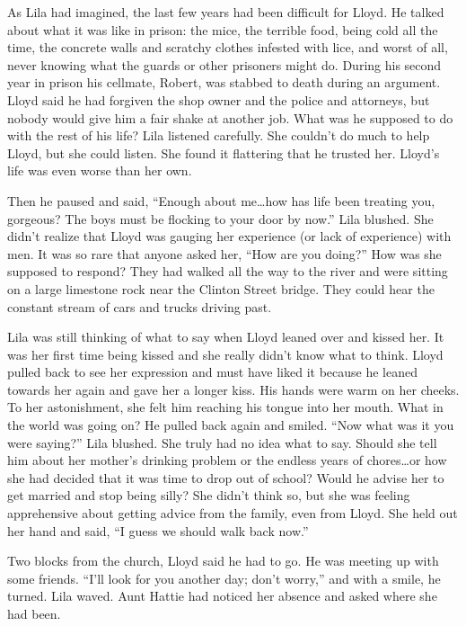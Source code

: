 \documentclass[
  american,
  letterpaper,
]{book}
\begin{document}
As Lila had imagined, the last few years had been difficult for Lloyd.
He talked about what it was like in prison: the mice, the terrible food,
being cold all the time, the concrete walls and scratchy clothes
infested with lice, and worst of all, never knowing what the guards or
other prisoners might do. During his second year in prison his cellmate,
Robert, was stabbed to death during an argument. Lloyd said he had
forgiven the shop owner and the police and attorneys, but nobody would
give him a fair shake at another job. What was he supposed to do with
the rest of his life? Lila listened carefully. She couldn't do much to
help Lloyd, but she could listen. She found it flattering that he
trusted her. Lloyd's life was even worse than her own.

Then he paused and said, ``Enough about me\ldots how has life been
treating you, gorgeous? The boys must be flocking to your door by now.''
Lila blushed. She didn't realize that Lloyd was gauging her experience
(or lack of experience) with men. It was so rare that anyone asked her,
``How are you doing?'' How was she supposed to respond? They had walked
all the way to the river and were sitting on a large limestone rock near
the Clinton Street bridge. They could hear the constant stream of cars
and trucks driving past.

Lila was still thinking of what to say when Lloyd leaned over and kissed
her. It was her first time being kissed and she really didn't know what
to think. Lloyd pulled back to see her expression and must have liked it
because he leaned towards her again and gave her a longer kiss. His
hands were warm on her cheeks. To her astonishment, she felt him
reaching his tongue into her mouth. What in the world was going on? He
pulled back again and smiled. ``Now what was it you were saying?'' Lila
blushed. She truly had no idea what to say. Should she tell him about
her mother's drinking problem or the endless years of chores\ldots or
how she had decided that it was time to drop out of school? Would he
advise her to get married and stop being silly? She didn't think so, but
she was feeling apprehensive about getting advice from the family, even
from Lloyd. She held out her hand and said, ``I guess we should walk
back now.''

Two blocks from the church, Lloyd said he had to go. He was meeting up
with some friends. ``I'll look for you another day; don't worry,'' and
with a smile, he turned. Lila waved. Aunt Hattie had noticed her absence
and asked where she had been.
\end{document}
